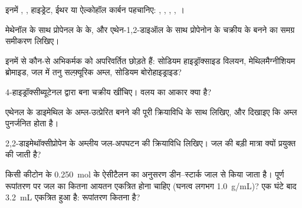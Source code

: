 \begin{exercise}[$\star$]\label{exo:b1:acetals-protection:1}
इनमें , , हाइड्रेट, ईथर या ऐल्कोहॉल कार्बन पहचानिए:
, , , ,
।
\end{exercise}

\begin{exercise}[$\star$]\label{exo:b1:acetals-protection:2}
मेथेनॉल के साथ प्रोपेनल के  के, और एथेन-1,2-डाइऑल के साथ
प्रोपेनोन के चक्रीय  के बनने का समग्र समीकरण लिखिए।
\end{exercise}

\begin{exercise}[$\star$]\label{exo:b1:acetals-protection:3}
इनमें से कौन-से अभिकर्मक  को अपरिवर्तित छोड़ते हैं: सोडियम हाइड्रॉक्साइड
विलयन, मेथिलमैग्नीशियम ब्रोमाइड, जल में तनु सल्फ़्यूरिक अम्ल, सोडियम
बोरोहाइड्राइड?
\end{exercise}

\begin{exercise}[$\star$]\label{exo:b1:acetals-protection:4}
4-हाइड्रॉक्सीब्यूटेनल द्वारा बना चक्रीय  खींचिए। वलय का आकार
क्या है?
\end{exercise}

\begin{exercise}[$\star\star$]\label{exo:b1:acetals-protection:5}
एथेनल के डाइमेथिल  के अम्ल-उत्प्रेरित बनने की पूरी क्रियाविधि
 के साथ लिखिए, और दिखाइए कि अम्ल
पुनर्जनित होता है।
\end{exercise}

\begin{exercise}[$\star\star$]\label{exo:b1:acetals-protection:6}
2,2-डाइमेथॉक्सीप्रोपेन के अम्लीय जल-अपघटन की क्रियाविधि लिखिए।
जल की बड़ी मात्रा क्यों प्रयुक्त की जाती है?
\end{exercise}

\begin{exercise}[$\star\star$]\label{exo:b1:acetals-protection:7}
किसी कीटोन के \qty{0.250}{mol} के ऐसीटैलन का अनुसरण
डीन--स्टार्क जाल से किया जाता है। पूर्ण रूपांतरण पर जल का कितना आयतन एकत्रित होना चाहिए
(घनत्व लगभग \qty{1.0}{g/mL})? एक घंटे बाद
\qty{3.2}{mL} एकत्रित हुआ है: रूपांतरण कितना है?
\end{exercise}

